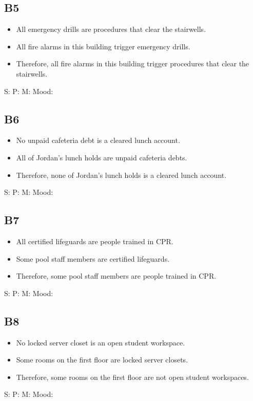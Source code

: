 \documentclass[11pt]{article}
\newcommand{\syllblock}[3]{%
\begin{itemize}[leftmargin=1.2em]
\item #1
\item #2
\item #3
\end{itemize}
}
\begin{document}
\subsection*{B5}
\syllblock
{All emergency drills are procedures that clear the stairwells.}
{All fire alarms in this building trigger emergency drills.}
{Therefore, all fire alarms in this building trigger procedures that clear the stairwells.}
S: \underline{\hspace{1.7in}}
P: \underline{\hspace{1.7in}}
M: \underline{\hspace{1.7in}}
Mood: \underline{\hspace{1.0in}}

\subsection*{B6}
\syllblock
{No unpaid cafeteria debt is a cleared lunch account.}
{All of Jordan's lunch holds are unpaid cafeteria debts.}
{Therefore, none of Jordan's lunch holds is a cleared lunch account.}
S: \underline{\hspace{1.7in}}
P: \underline{\hspace{1.7in}}
M: \underline{\hspace{1.7in}}
Mood: \underline{\hspace{1.0in}}

\subsection*{B7}
\syllblock
{All certified lifeguards are people trained in CPR.}
{Some pool staff members are certified lifeguards.}
{Therefore, some pool staff members are people trained in CPR.}
S: \underline{\hspace{1.7in}}
P: \underline{\hspace{1.7in}}
M: \underline{\hspace{1.7in}}
Mood: \underline{\hspace{1.0in}}

\subsection*{B8}
\syllblock
{No locked server closet is an open student workspace.}
{Some rooms on the first floor are locked server closets.}
{Therefore, some rooms on the first floor are not open student workspaces.}
S: \underline{\hspace{1.7in}}
P: \underline{\hspace{1.7in}}
M: \underline{\hspace{1.7in}}
Mood: \underline{\hspace{1.0in}}
\end{document}
